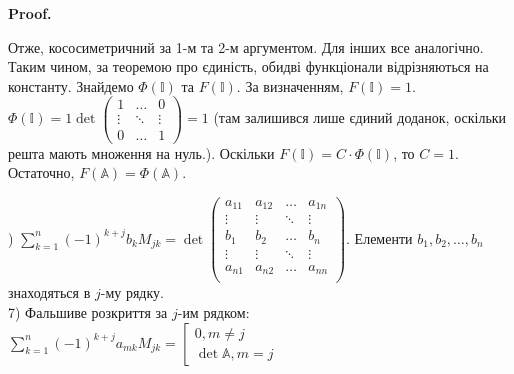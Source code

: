 \documentclass[a4paper, 10pt]{article}
\makeatletter
\theoremstyle{theoremdd}
\renewenvironment{proof}[1][Proof.\\]{\par
\pushQED{\hfill \qed}%
\normalfont \topsep6\p@\@plus6\p@\relax
\trivlist
\item\relax
{\bfseries
#1\@addpunct{.}}\hspace\labelsep\ignorespaces
}{%
\popQED\endtrivlist\@endpefalse
}
\makeatother
\begin{document}
\begin{proof}
Отже, кососиметричний за 1-м та 2-м аргументом. Для інших все аналогічно.
\bigskip \\
Таким чином, за теоремою про єдиність, обидві функціонали відрізняються на константу. Знайдемо $\Phi(\mathbb{I})$ та $F(\mathbb{I})$. За визначенням, $F(\mathbb{I}) = 1$.\\
$\Phi(\mathbb{I}) = 1 \det \begin{pmatrix} 1 & \dots & 0 \\ \vdots & \ddots & \vdots \\ 0 & \dots & 1 \end{pmatrix} = 1$ (там залишився лише єдиний доданок, оскільки решта мають множення на нуль.). Оскільки $F(\mathbb{I}) = C\cdot \Phi(\mathbb{I})$, то $C = 1$. Остаточно, $F(\mathbb{A}) = \Phi(\mathbb{A})$.
\end{proof}

) $\displaystyle\sum_{k=1}^n (-1)^{k+j} b_k M_{jk} = \det \begin{pmatrix}
a_{11} & a_{12} & \dots & a_{1n} \\
\vdots & \vdots & \ddots & \vdots \\
b_1 & b_2 & \dots & b_n \\
\vdots & \vdots & \ddots & \vdots \\
a_{n1} & a_{n2} & \dots & a_{nn} \\
\end{pmatrix}$. Елементи $b_1,b_2,\dots,b_n$ знаходяться в $j$-му рядку.
\bigskip \\
7) \textquotedbl Фальшиве\textquotedbl{} розкриття за $j$-им рядком: $\displaystyle \sum_{k=1}^n (-1)^{k+j} a_{mk}M_{jk} = \left[\begin{gathered} 0, m \neq j \\ \det \mathbb{A}, m = j \end{gathered} \right.$
\end{document}
